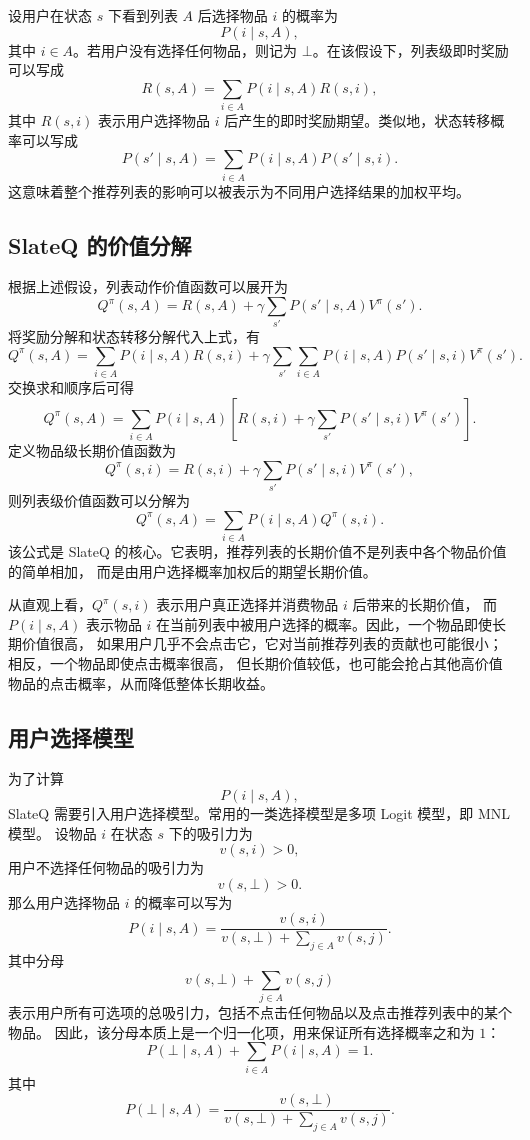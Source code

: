 \documentclass[11pt]{ctexart}
\begin{document}
设用户在状态 $s$ 下看到列表 $A$ 后选择物品 $i$ 的概率为
\[
P(i\mid s,A),
\]
其中 $i\in A$。若用户没有选择任何物品，则记为 $\bot$。在该假设下，列表级即时奖励可以写成
\[
R(s,A)
=
\sum_{i\in A}P(i\mid s,A)R(s,i),
\]
其中 $R(s,i)$ 表示用户选择物品 $i$ 后产生的即时奖励期望。类似地，状态转移概率可以写成
\[
P(s'\mid s,A)
=
\sum_{i\in A}P(i\mid s,A)P(s'\mid s,i).
\]
这意味着整个推荐列表的影响可以被表示为不同用户选择结果的加权平均。

\subsection{SlateQ 的价值分解}

根据上述假设，列表动作价值函数可以展开为
\[
Q^{\pi}(s,A)
=
R(s,A)
+
\gamma
\sum_{s'}P(s'\mid s,A)V^{\pi}(s').
\]
将奖励分解和状态转移分解代入上式，有
\[
Q^{\pi}(s,A)
=
\sum_{i\in A}P(i\mid s,A)R(s,i)
+
\gamma
\sum_{s'}
\sum_{i\in A}
P(i\mid s,A)P(s'\mid s,i)V^{\pi}(s').
\]
交换求和顺序后可得
\[
Q^{\pi}(s,A)
=
\sum_{i\in A}
P(i\mid s,A)
\left[
R(s,i)
+
\gamma
\sum_{s'}P(s'\mid s,i)V^{\pi}(s')
\right].
\]
定义物品级长期价值函数为
\[
Q^{\pi}(s,i)
=
R(s,i)
+
\gamma
\sum_{s'}P(s'\mid s,i)V^{\pi}(s'),
\]
则列表级价值函数可以分解为
\[
Q^{\pi}(s,A)
=
\sum_{i\in A}
P(i\mid s,A)Q^{\pi}(s,i).
\]
该公式是 SlateQ 的核心。它表明，推荐列表的长期价值不是列表中各个物品价值的简单相加，
而是由用户选择概率加权后的期望长期价值。

从直观上看，$Q^{\pi}(s,i)$ 表示用户真正选择并消费物品 $i$ 后带来的长期价值，
而 $P(i\mid s,A)$ 表示物品 $i$ 在当前列表中被用户选择的概率。因此，一个物品即使长期价值很高，
如果用户几乎不会点击它，它对当前推荐列表的贡献也可能很小；相反，一个物品即使点击概率很高，
但长期价值较低，也可能会抢占其他高价值物品的点击概率，从而降低整体长期收益。

\subsection{用户选择模型}

为了计算
\[
P(i\mid s,A),
\]
SlateQ 需要引入用户选择模型。常用的一类选择模型是多项 Logit 模型，即 MNL 模型。
设物品 $i$ 在状态 $s$ 下的吸引力为
\[
v(s,i)>0,
\]
用户不选择任何物品的吸引力为
\[
v(s,\bot)>0.
\]
那么用户选择物品 $i$ 的概率可以写为
\[
P(i\mid s,A)
=
\frac{v(s,i)}
{v(s,\bot)+\sum_{j\in A}v(s,j)}.
\]
其中分母
\[
v(s,\bot)+\sum_{j\in A}v(s,j)
\]
表示用户所有可选项的总吸引力，包括不点击任何物品以及点击推荐列表中的某个物品。
因此，该分母本质上是一个归一化项，用来保证所有选择概率之和为 $1$：
\[
P(\bot\mid s,A)+\sum_{i\in A}P(i\mid s,A)=1.
\]
其中
\[
P(\bot\mid s,A)
=
\frac{v(s,\bot)}
{v(s,\bot)+\sum_{j\in A}v(s,j)}.
\]
\end{document}
